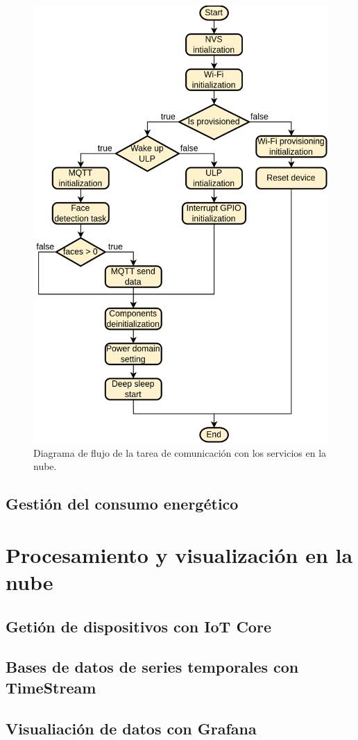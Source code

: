 \begin{figure}[h]
	\centering
	\includegraphics[scale=0.22]{./Figures/fw_comm_flow.png}
	\caption{Diagrama de flujo de la tarea de comunicación con los servicios en la nube.}
	\label{fig:fw_comm_flow}
\end{figure}

\subsection{Gestión del consumo energético}


\section{Procesamiento y visualización en la nube}
\subsection{Getión de dispositivos con IoT Core}
\subsection{Bases de datos de series temporales con TimeStream}
\subsection{Visualiación de datos con Grafana}





